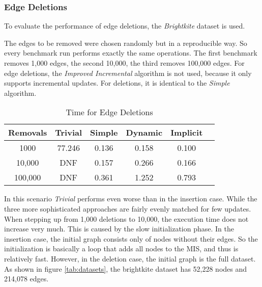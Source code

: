 \documentclass[letterpaper,12pt]{article}
\begin{document}

\subsubsection{Edge Deletions}

To evaluate the performance of edge deletions, the \textit{Brightkite}
\cite{konect:2016:loc-brightkite_edges, konect:cho2011, konect} dataset is used.

The edges to be removed were chosen randomly but in a reproducible way. So every
benchmark run performs exactly the same operations. The first benchmark removes
1,000 edges, the second 10,000, the third removes 100,000 edges. For edge
deletions, the \textit{Improved Incremental} algorithm is not used, because it
only supports incremental updates. For deletions, it is identical to the
\textit{Simple} algorithm.

\begin{table}[h]
  \caption{Time for Edge Deletions}
  \label{tab:deletion}
  \centering
  \setlength{\extrarowheight}{0.3em}
	\begin{tabular}{|c|c|c|c|c|c|}
		\hline
		Removals & Trivial & Simple & Dynamic & Implicit \\
		\hline
		\hline
		1000 & 77.246 & 0.136 & 0.158 & 0.100 \\ %
		\hline
		10,000 & DNF & 0.157 & 0.266 & 0.166 \\
		\hline
		100,000 & DNF & 0.361 & 1.252 & 0.793 \\
		\hline
	\end{tabular}
\end{table}

In this scenario \textit{Trivial} performs even worse than in the insertion
case. While the three more sophisticated approaches are fairly evenly matched
for few updates. When stepping up from 1,000 deletions to 10,000, the execution
time does not increase very much. This is caused by the slow
initialization phase. In the insertion case, the initial graph consists only of
nodes without their edges. So the initialization is basically a loop that
adds all nodes to the MIS, and thus is relatively fast. However, in the deletion
case, the initial graph is the full dataset. As shown in figure
\ref{tab:datasets}, the brightkite dataset has 52,228 nodes and 214,078 edges.
\end{document}
